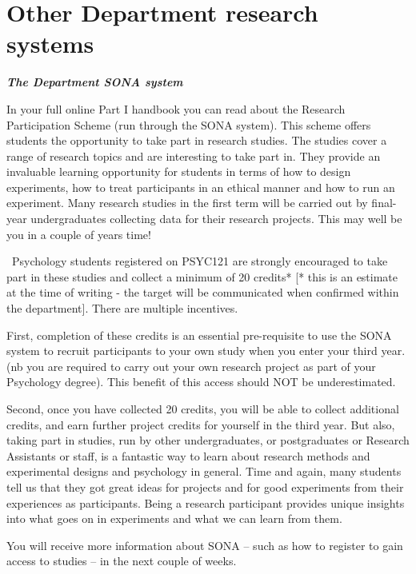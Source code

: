 \documentclass[
]{book}
\begin{document}
\hypertarget{other-department-research-systems}{%
\section{Other Department research systems}\label{other-department-research-systems}}

\textbf{\emph{The Department SONA system}}

In your full online Part I handbook you can read about the Research Participation Scheme (run through the SONA system). This scheme offers students the opportunity to take part in research studies. The studies cover a range of research topics and are interesting to take part in. They provide an invaluable learning opportunity for students in terms of how to design experiments, how to treat participants in an ethical manner and how to run an experiment. Many research studies in the first term will be carried out by final-year undergraduates collecting data for their research projects. This may well be you in a couple of years time!

~Psychology students registered on PSYC121 are strongly encouraged to take part in these studies and collect a minimum of 20 credits* {[}* this is an estimate at the time of writing - the target will be communicated when confirmed within the department{]}. There are multiple incentives.

First, completion of these credits is an essential pre-requisite to use the SONA system to recruit participants to your own study when you enter your third year. (nb you are required to carry out your own research project as part of your Psychology degree). This benefit of this access should NOT be underestimated.

Second, once you have collected 20 credits, you will be able to collect additional credits, and earn further project credits for yourself in the third year. But also, taking part in studies, run by other undergraduates, or postgraduates or Research Assistants or staff, is a fantastic way to learn about research methods and experimental designs and psychology in general. Time and again, many students tell us that they got great ideas for projects and for good experiments from their experiences as participants. Being a research participant provides unique insights into what goes on in experiments and what we can learn from them.

You will receive more information about SONA -- such as how to register to gain access to studies -- in the next couple of weeks.
\end{document}
